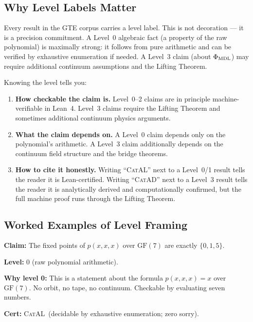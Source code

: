 \documentclass[11pt,a4paper]{article}
\newcommand{\PhiMDL}{\Phi_{\rm MDL}}
\newcommand{\poly}{p}
\newcommand{\CatAL}{\textsc{CatAL}}
\begin{document}
\subsection{Why Level Labels Matter}

Every result in the GTE corpus carries a level label.
This is not decoration --- it is a precision commitment.
A Level~0 algebraic fact (a property of the raw polynomial) is maximally
strong: it follows from pure arithmetic and can be verified by exhaustive
enumeration if needed.
A Level~3 claim (about $\PhiMDL$) may require additional continuum
assumptions and the Lifting Theorem.

\medskip
Knowing the level tells you:
\begin{enumerate}[itemsep=4pt]
  \item \textbf{How checkable the claim is.}
    Level~0--2 claims are in principle machine-verifiable in Lean~4.
    Level~3 claims require the Lifting Theorem and sometimes additional
    continuum physics arguments.

  \item \textbf{What the claim depends on.}
    A Level~0 claim depends only on the polynomial's arithmetic.
    A Level~3 claim additionally depends on the continuum field structure
    and the bridge theorems.

  \item \textbf{How to cite it honestly.}
    Writing ``\textsc{CatAL}'' next to a Level~0/1 result tells the reader
    it is Lean-certified.
    Writing ``\textsc{CatAD}'' next to a Level~3 result tells the reader it
    is analytically derived and computationally confirmed, but the full
    machine proof runs through the Lifting Theorem.
\end{enumerate}

\subsection{Worked Examples of Level Framing}

\medskip
\begin{tcolorbox}[colback=levzero,colframe=orange!50!black,
  title={Level~0 example: ground states are $\{0,1,5\}$}]
\textbf{Claim:} The fixed points of $\poly(x,x,x)$ over $\mathrm{GF}(7)$
are exactly $\{0, 1, 5\}$.

\textbf{Level:} 0 (raw polynomial arithmetic).

\textbf{Why level 0:} This is a statement about the formula
$\poly(x,x,x) = x$ over $\mathrm{GF}(7)$.
No orbit, no tape, no continuum.
Checkable by evaluating seven numbers.

\textbf{Cert:} \CatAL\ (decidable by exhaustive enumeration; zero sorry).
\end{tcolorbox}
\end{document}
